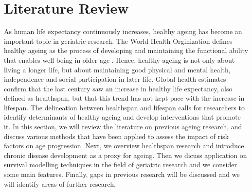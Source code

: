 \chapter{Literature Review}
\label{chap:lit_review} 

As human life expectancy continuously increases, healthy ageing has become an important topic in geriatric research. The World Health Orginization defines healthy ageing as the process of developing and maintaining the functional ability that enables well-being in older age \citep{WHO}. Hence, healthy ageing is not only about living a longer life, but about maintaining good physical and mental health, independence and social participation in later life. Global health estimates confirm that the last century saw an increase in healthy life expectancy, also defined as healthspan, but that this trend has not kept pace with the increase in lifespan. The delineation between healthspan and lifespan calls for researchers to identify determinants of healthy ageing and develop interventions that promote it. In this section, we will review the literature on previous ageing research, and discuss various methods that have been applied to assess the impact of risk factors on age progression. Next, we overview healthspan research and introduce chronic disease development as a proxy for ageing. Then we dicuss application on survival modelling techniques in the field of geriatric research and we consider some main features. Finally, gaps in previous research will be discussed and we will identify areas of further research. %




